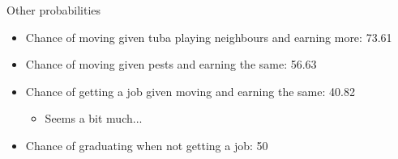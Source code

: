 \documentclass{beamer}
\begin{document}
\begin{frame}{Other probabilities}
    \begin{itemize}
        \item Chance of moving given tuba playing neighbours and earning more:
            73.61\\
        \item Chance of moving given pests and earning the same: 56.63
        \item Chance of getting a job given moving and earning the same: 40.82
            \begin{itemize}
                \item  Seems a bit much...
            \end{itemize}
        \item Chance of graduating when not getting a job: 50
    \end{itemize}
\end{frame}
\end{document}
